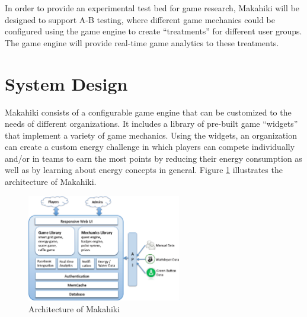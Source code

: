\documentclass[11pt]{article}
\begin{document}
In order to provide an experimental test bed for game research, Makahiki will be designed to support A-B testing, where different game mechanics could be configured using the game engine to create ``treatments'' for different user groups. The game engine will provide real-time game analytics to these treatments.

\section{System Design}

Makahiki consists of a configurable game engine that can be customized to the needs of different organizations.  It includes a library of pre-built game ``widgets'' that implement a variety of game mechanics.  Using the widgets, an organization can create a custom energy challenge in which players can compete individually and/or in teams to earn the most points by reducing their energy consumption as well as by learning about energy concepts in general. Figure \ref{fig:makahiki-architecture} illustrates the architecture of Makahiki.

\begin{figure}[ht!]
  \center
  \includegraphics[width=0.6\textwidth]{makahiki-system-architecture}
  \caption{Architecture of Makahiki}
  \label{fig:makahiki-architecture}
\end{figure}
\end{document}
